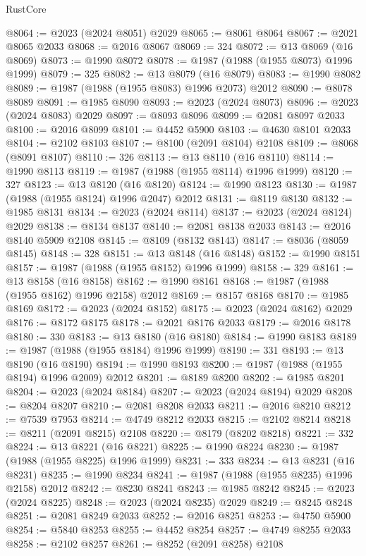 \begin{lexlean}{RustCore}
\begin{coremodule}
@8064 := @2023 (@2024 @8051) @2029
@8065 := @8061 @8064
@8067 := @2021 @8065 @2033
@8068 := @2016 @8067
@8069 := 324
@8072 := @13 @8069 (@16 @8069)
@8073 := @1990 @8072
@8078 := @1987 (@1988 (@1955 @8073) @1996 @1999)
@8079 := 325
@8082 := @13 @8079 (@16 @8079)
@8083 := @1990 @8082
@8089 := @1987 (@1988 (@1955 @8083) @1996 @2073) @2012
@8090 := @8078 @8089
@8091 := @1985 @8090
@8093 := @2023 (@2024 @8073)
@8096 := @2023 (@2024 @8083) @2029
@8097 := @8093 @8096
@8099 := @2081 @8097 @2033
@8100 := @2016 @8099
@8101 := @4452 @5900
@8103 := @4630 @8101 @2033
@8104 := @2102 @8103
@8107 := @8100 (@2091 @8104) @2108
@8109 := @8068 (@8091 @8107)
@8110 := 326
@8113 := @13 @8110 (@16 @8110)
@8114 := @1990 @8113
@8119 := @1987 (@1988 (@1955 @8114) @1996 @1999)
@8120 := 327
@8123 := @13 @8120 (@16 @8120)
@8124 := @1990 @8123
@8130 := @1987 (@1988 (@1955 @8124) @1996 @2047) @2012
@8131 := @8119 @8130
@8132 := @1985 @8131
@8134 := @2023 (@2024 @8114)
@8137 := @2023 (@2024 @8124) @2029
@8138 := @8134 @8137
@8140 := @2081 @8138 @2033
@8143 := @2016 @8140 @5909 @2108
@8145 := @8109 (@8132 @8143)
@8147 := @8036 (@8059 @8145)
@8148 := 328
@8151 := @13 @8148 (@16 @8148)
@8152 := @1990 @8151
@8157 := @1987 (@1988 (@1955 @8152) @1996 @1999)
@8158 := 329
@8161 := @13 @8158 (@16 @8158)
@8162 := @1990 @8161
@8168 := @1987 (@1988 (@1955 @8162) @1996 @2158) @2012
@8169 := @8157 @8168
@8170 := @1985 @8169
@8172 := @2023 (@2024 @8152)
@8175 := @2023 (@2024 @8162) @2029
@8176 := @8172 @8175
@8178 := @2021 @8176 @2033
@8179 := @2016 @8178
@8180 := 330
@8183 := @13 @8180 (@16 @8180)
@8184 := @1990 @8183
@8189 := @1987 (@1988 (@1955 @8184) @1996 @1999)
@8190 := 331
@8193 := @13 @8190 (@16 @8190)
@8194 := @1990 @8193
@8200 := @1987 (@1988 (@1955 @8194) @1996 @2009) @2012
@8201 := @8189 @8200
@8202 := @1985 @8201
@8204 := @2023 (@2024 @8184)
@8207 := @2023 (@2024 @8194) @2029
@8208 := @8204 @8207
@8210 := @2081 @8208 @2033
@8211 := @2016 @8210
@8212 := @7539 @7953
@8214 := @4749 @8212 @2033
@8215 := @2102 @8214
@8218 := @8211 (@2091 @8215) @2108
@8220 := @8179 (@8202 @8218)
@8221 := 332
@8224 := @13 @8221 (@16 @8221)
@8225 := @1990 @8224
@8230 := @1987 (@1988 (@1955 @8225) @1996 @1999)
@8231 := 333
@8234 := @13 @8231 (@16 @8231)
@8235 := @1990 @8234
@8241 := @1987 (@1988 (@1955 @8235) @1996 @2158) @2012
@8242 := @8230 @8241
@8243 := @1985 @8242
@8245 := @2023 (@2024 @8225)
@8248 := @2023 (@2024 @8235) @2029
@8249 := @8245 @8248
@8251 := @2081 @8249 @2033
@8252 := @2016 @8251
@8253 := @4750 @5900
@8254 := @5840 @8253
@8255 := @4452 @8254
@8257 := @4749 @8255 @2033
@8258 := @2102 @8257
@8261 := @8252 (@2091 @8258) @2108

\end{coremodule}
\end{lexlean}
